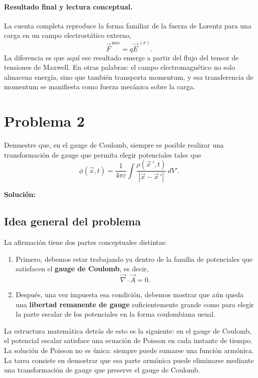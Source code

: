 \documentclass{article}
\numberwithin{equation}{section}
\newcommand{\Eext}{\vec E^{\,(\sigma)}}
\newcommand{\Fvec}{\vec F^{\,\mathrm{mec}}}
\newcommand{\grad}{\vec\nabla}
\newcommand{\A}{\vec A}
\begin{document}
\paragraph{Resultado final y lectura conceptual.}
La cuenta completa reproduce la forma familiar de la fuerza de Lorentz para una carga en un campo electrostático externo,
\begin{equation*}
    \Fvec=q\Eext.
\end{equation*}
La diferencia es que aquí ese resultado emerge a partir del flujo del tensor de tensiones de Maxwell. En otras palabras: el campo electromagnético no solo almacena energía, sino que también transporta momentum, y esa transferencia de momentum se manifiesta como fuerza mecánica sobre la carga.


\newpage
\section{Problema 2}
Demuestre que, en el gauge de Coulomb, siempre es posible realizar una transformación de gauge que permita elegir potenciales tales que
\begin{equation}
\phi(\vec x,t)=\frac{1}{4\pi\varepsilon}\int\frac{\rho(\vec x\,',t)}{|\vec x-\vec x\,'|}\,dV'.
\end{equation}

\textbf{Solución:}
\subsection{Idea general del problema}

La afirmación tiene dos partes conceptuales distintas:
\begin{enumerate}[leftmargin=1.5em]
    \item Primero, debemos estar trabajando ya dentro de la familia de potenciales que satisfacen el \textbf{gauge de Coulomb}, es decir,
    \begin{equation}
        \grad\cdot\A=0.
    \end{equation}
    \item Después, una vez impuesta esa condición, debemos mostrar que aún queda una \textbf{libertad remanente de gauge} suficientemente grande como para elegir la parte escalar de los potenciales en la forma coulombiana usual.
\end{enumerate}

La estructura matemática detrás de esto es la siguiente: en el gauge de Coulomb, el potencial escalar satisface una ecuación de Poisson en cada instante de tiempo. La solución de Poisson no es única: siempre puede sumarse una función armónica. La tarea consiste en demostrar que esa parte armónica puede eliminarse mediante una transformación de gauge que preserve el gauge de Coulomb.
\end{document}
